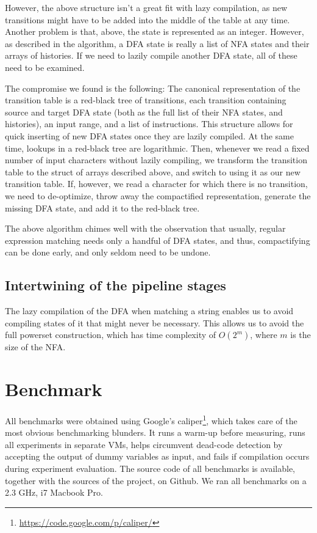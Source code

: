 \documentclass[english]{sigplanconf}
\theoremstyle{definition}
\begin{document}
However, the above structure isn't a great fit with lazy compilation,
as new transitions might have to be added into the middle of the
table at any time.  Another problem is that, above, the state is
represented as an integer.  However, as described in the algorithm,
a DFA state is really a list of NFA states and their arrays of
histories. If we need to lazily compile another DFA state, all of
these need to be examined.

The compromise we found is the following: The canonical representation
of the transition table is a red-black tree of transitions, each
transition containing source and target DFA state (both as the full
list of their NFA states, and histories), an input range, and a
list of instructions. This structure allows for quick inserting of
new DFA states once they are lazily compiled.  At the same time,
lookups in a red-black tree are logarithmic.  Then, whenever we
read a fixed number of input characters without lazily compiling,
we transform the transition table to the struct of arrays described
above, and switch to using it as our new transition table.
If, however, we read a character for which there is no transition, we need to
de-optimize, throw away the compactified representation, 
generate the missing DFA state, and add it to the red-black tree.

The above algorithm chimes well with the observation that usually,
regular expression matching needs only a handful of DFA states, and thus,
compactifying can be done early, and only seldom need to be undone.

\subsection{Intertwining of the pipeline stages}
The lazy compilation of the DFA when matching a string enables us
to avoid compiling states of it that might never be necessary. This
allows us to avoid the full powerset construction\cite{Sips05a}, which has 
time complexity of $O(2^m)$, where $m$ is the size of the NFA.

\section{Benchmark}
All benchmarks were obtained using Google's
caliper\footnote{\url{https://code.google.com/p/caliper/}}, which
takes care of the most obvious benchmarking blunders.  It runs a
warm-up before measuring, runs all experiments in separate VMs,
helps circumvent dead-code detection by accepting the output of
dummy variables as input, and fails if compilation occurs during
experiment evaluation.  The source code of all benchmarks is
available, together with the sources of the project, on Github. We
ran all benchmarks on a 2.3 GHz, i7 Macbook Pro.
\end{document}
